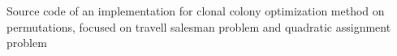 Source code of an implementation for clonal colony optimization method on permutations, focused on travell salesman problem and quadratic assignment problem 